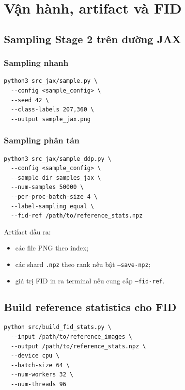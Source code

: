 \section{Vận hành, artifact và FID}

\subsection{Sampling Stage 2 trên đường JAX}

\subsubsection{Sampling nhanh}

\begin{lstlisting}[style=rae]
python3 src_jax/sample.py \
  --config <sample_config> \
  --seed 42 \
  --class-labels 207,360 \
  --output sample_jax.png
\end{lstlisting}

\subsubsection{Sampling phân tán}

\begin{lstlisting}[style=rae]
python3 src_jax/sample_ddp.py \
  --config <sample_config> \
  --sample-dir samples_jax \
  --num-samples 50000 \
  --per-proc-batch-size 4 \
  --label-sampling equal \
  --fid-ref /path/to/reference_stats.npz
\end{lstlisting}

Artifact đầu ra:

\begin{itemize}[leftmargin=1.5em]
  \item các file PNG theo index;
  \item các shard \texttt{.npz} theo rank nếu bật \texttt{--save-npz};
  \item giá trị FID in ra terminal nếu cung cấp \texttt{--fid-ref}.
\end{itemize}

\subsection{Build reference statistics cho FID}

\begin{lstlisting}[style=rae]
python src/build_fid_stats.py \
  --input /path/to/reference_images \
  --output /path/to/reference_stats.npz \
  --device cpu \
  --batch-size 64 \
  --num-workers 32 \
  --num-threads 96
\end{lstlisting}

